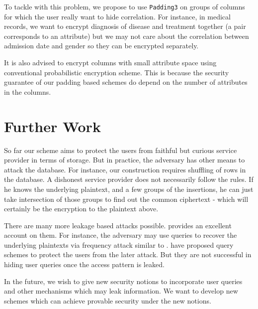 To tackle with this problem, we propose to use \texttt{Padding3} on groups of columns for which the user really want to hide correlation. For instance, in medical records, we want to encrypt diagnosis of disease and treatment together (a pair corresponds to an attribute) but we may not care about the correlation between admission date and gender so they can be encrypted separately.

It is also advised to encrypt columns with small attribute space using conventional probabilistic encryption scheme. This is because the security guarantee of our padding based schemes do depend on the number of attributes in the columns.




\section{Further Work}
So far our scheme aims to protect the users from faithful but curious service provider in terms of storage. But in practice, the adversary has other means to attack the database. For instance, our construction requires shuffling of rows in the database. A dishonest service provider does not necessarily follow the rules. If he knows the underlying plaintext, and a few groups of the insertions, he can just take intersection of those groups to find out the common ciphertext - which will certainly be the encryption to the plaintext above.

There are many more leakage based attacks possible. \cite{cryptoeprint:2016:718} provides an excellent account on them. For instance, the adversary may use queries to recover the underlying plaintexts via frequency attack similar to \cite{Naveed:2015:IAP:2810103.2813651}. \cite{Islam12accesspattern, Liu:2014:SPL:2580107.2580271} have proposed query schemes to protect the users from the later attack. But they are not successful in hiding user queries once the access pattern is leaked.

In the future, we wish to give new security notions to incorporate user queries and other mechanisms which may leak information. We want to develop new schemes which can achieve provable security under the new notions.








